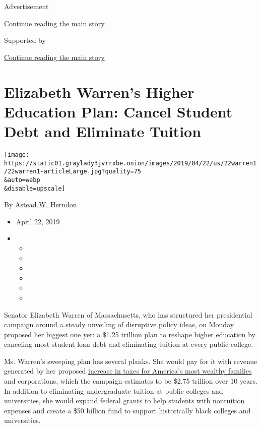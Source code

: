 Advertisement

\protect\hyperlink{after-top}{Continue reading the main story}

Supported by

\protect\hyperlink{after-sponsor}{Continue reading the main story}

\hypertarget{elizabeth-warrens-higher-education-plan-cancel-student-debt-and-eliminate-tuition}{%
\section{Elizabeth Warren's Higher Education Plan: Cancel Student Debt
and Eliminate
Tuition}\label{elizabeth-warrens-higher-education-plan-cancel-student-debt-and-eliminate-tuition}}

\texttt{[image: https://static01.graylady3jvrrxbe.onion/images/2019/04/22/us/22warren1/22warren1-articleLarge.jpg?quality=75\\\&auto=webp\\\&disable=upscale]}

By \href{https://www.nytimes3xbfgragh.onion/by/astead-w-herndon}{Astead
W. Herndon}

\begin{itemize}
\item
  April 22, 2019
\item
  \begin{itemize}
  \item
  \item
  \item
  \item
  \item
  \item
  \end{itemize}
\end{itemize}

Senator Elizabeth Warren of Massachusetts, who has structured her
presidential campaign around a steady unveiling of disruptive policy
ideas, on Monday proposed her biggest one yet: a \$1.25 trillion plan to
reshape higher education by canceling most student loan debt and
eliminating tuition at every public college.

Ms. Warren's sweeping plan has several planks. She would pay for it with
revenue generated by her proposed
\href{https://www.nytimes3xbfgragh.onion/2019/01/24/us/politics/wealth-tax-democrats.html}{increase
in taxes for America's most wealthy families} and corporations, which
the campaign estimates to be \$2.75 trillion over 10 years. In addition
to eliminating undergraduate tuition at public colleges and
universities, she would expand federal grants to help students with
nontuition expenses and create a \$50 billion fund to support
historically black colleges and universities.

